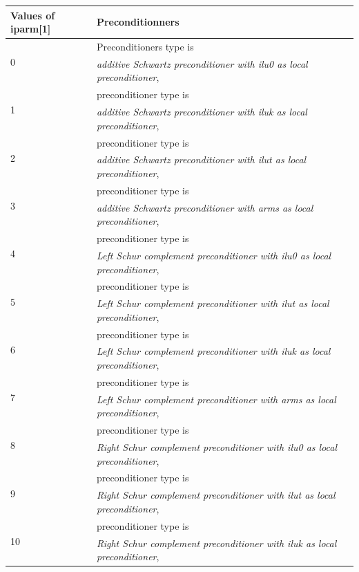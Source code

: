 \documentclass[a4paper,twoside,12pt]{book}
\begin{document}
\begin{table}[hbtp]
\begin{tabular}{|l|l|} \hline
Values of iparm[1] & Preconditionners \\ \hline
\multirow{2}{*}{0} & Preconditioners type is  \\ & \textit{additive Schwartz
preconditioner with ilu0 as local preconditioner},\\ \hline
\multirow{2}{*}{1} &  preconditioner type is \\ & \textit{additive Schwartz
preconditioner with iluk as local preconditioner},\\ \hline
\multirow{2}{*}{2} &  preconditioner type is \\ & \textit{additive Schwartz
preconditioner with ilut as local preconditioner},\\ \hline
\multirow{2}{*}{3} &  preconditioner type is \\ & \textit{additive Schwartz
preconditioner with arms as local preconditioner},\\ \hline
\multirow{2}{*}{4} &  preconditioner type is \\ & \textit{Left Schur complement
preconditioner with ilu0 as local preconditioner},\\ \hline
\multirow{2}{*}{5} &  preconditioner type is \\ & \textit{Left Schur complement
preconditioner with ilut as local preconditioner},\\ \hline
\multirow{2}{*}{6} &  preconditioner type is \\ & \textit{Left Schur complement
preconditioner with iluk as local preconditioner},\\ \hline
\multirow{2}{*}{7} &  preconditioner type is \\ & \textit{Left Schur complement
preconditioner with arms as local preconditioner},\\ \hline
\multirow{2}{*}{8} &  preconditioner type is \\ & \textit{Right Schur complement
preconditioner with ilu0 as local preconditioner},\\ \hline
\multirow{2}{*}{9} &  preconditioner type is \\ & \textit{Right Schur complement
preconditioner with ilut as local preconditioner},\\ \hline
\multirow{2}{*}{10} &  preconditioner type is \\ & \textit{Right Schur
complement preconditioner with iluk as local preconditioner},\\ \hline

\end{tabular}
\end{table}
\end{document}
